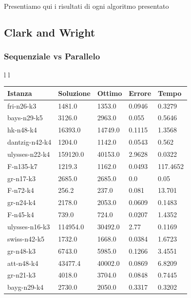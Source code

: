 \documentclass[]{article}
\begin{document}
Presentiamo qui i risultati di ogni algoritmo presentato 
\subsection{Clark and Wright}
\subsubsection{Sequenziale vs Parallelo}




\begin{tabular}{l l}
\small
			\begin{tabular}{||l | l l l l||} 
				\hline
				Istanza & Soluzione & Ottimo & Errore & Tempo \\ [0.5ex] 
				\hline\hline
				fri-n26-k3 & 1481.0 & 1353.0 & 0.0946 & 0.3279  \\
				bays-n29-k5 & 3126.0 & 2963.0 & 0.055 & 0.5646  \\
				hk-n48-k4 & 16393.0 & 14749.0 & 0.1115 & 1.3568  \\
				dantzig-n42-k4 & 1204.0 & 1142.0 & 0.0543 & 0.562  \\
				ulysses-n22-k4 & 159120.0 & 40153.0 & 2.9628 & 0.0322  \\
				F-n135-k7 & 1219.3 & 1162.0 & 0.0493 & 117.4652  \\
				gr-n17-k3 & 2685.0 & 2685.0 & 0.0 & 0.05  \\
				F-n72-k4 & 256.2 & 237.0 & 0.081 & 13.701  \\
				gr-n24-k4 & 2178.0 & 2053.0 & 0.0609 & 0.1483  \\
				F-n45-k4 & 739.0 & 724.0 & 0.0207 & 1.4352  \\
				ulysses-n16-k3 & 114954.0 & 30492.0 & 2.77 & 0.1169  \\
				swiss-n42-k5 & 1732.0 & 1668.0 & 0.0384 & 1.6723  \\
				gr-n48-k3 & 6743.0 & 5985.0 & 0.1266 & 3.4551  \\
				att-n48-k4 & 43477.4 & 40002.0 & 0.0869 & 6.8209  \\
				gr-n21-k3 & 4018.0 & 3704.0 & 0.0848 & 0.7445  \\
				bayg-n29-k4 & 2730.0 & 2050.0 & 0.3317 & 0.3202  \\
				[1ex] 
				\hline
			\end{tabular}

\small


\end{tabular}
\end{document}
